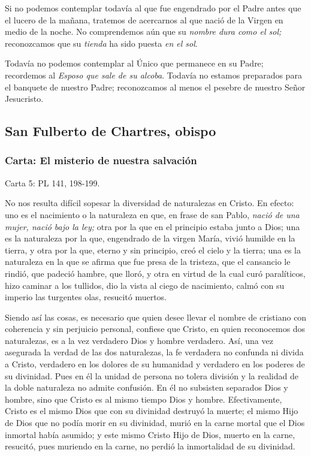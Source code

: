 Si no podemos contemplar todavía al que fue engendrado por el Padre antes que el lucero de la mañana, tratemos de acercarnos al que nació de la Virgen en medio de la noche. No comprendemos aún que su \emph{nombre dura como el sol;} reconozcamos que su \emph{tienda} ha sido puesta \emph{en el sol}.

Todavía no podemos contemplar al Único que permanece en su Padre; recordemos al \emph{Esposo que sale de su alcoba}. Todavía no estamos preparados para el banquete de nuestro Padre; reconozcamos al menos el pesebre de nuestro Señor Jesucristo.

\subsection{San Fulberto de Chartres, obispo}

\subsubsection{Carta: El misterio de nuestra salvación}

Carta 5: PL 141, 198-199.

No nos resulta difícil sopesar la diversidad de naturalezas en Cristo. En efecto: uno es el nacimiento o la naturaleza en que, en frase de san Pablo, \emph{nació de una mujer, nació bajo la ley;} otra por la que en el principio estaba junto a Dios; una es la naturaleza por la que, engendrado de la virgen María, vivió humilde en la tierra, y otra por la que, eterno y sin principio, creó el cielo y la tierra; una es la naturaleza en la que se afirma que fue presa de la tristeza, que el cansancio le rindió, que padeció hambre, que lloró, y otra en virtud de la cual curó paralíticos, hizo caminar a los tullidos, dio la vista al ciego de nacimiento, calmó con su imperio las turgentes olas, resucitó muertos.

Siendo así las cosas, es necesario que quien desee llevar el nombre de cristiano con coherencia y sin perjuicio personal, confiese que Cristo, en quien reconocemos dos naturalezas, es a la vez verdadero Dios y hombre verdadero. Así, una vez asegurada la verdad de las dos naturalezas, la fe verdadera no confunda ni divida a Cristo, verdadero en los dolores de su humanidad y verdadero en los poderes de su divinidad. Pues en él la unidad de persona no tolera división y la realidad de la doble naturaleza no admite confusión. En él no subsisten separados Dios y hombre, sino que Cristo es al mismo tiempo Dios y hombre. Efectivamente, Cristo es el mismo Dios que con su divinidad destruyó la muerte; el mismo Hijo de Dios que no podía morir en su divinidad, murió en la carne mortal que el Dios inmortal había asumido; y este mismo Cristo Hijo de Dios, muerto en la carne, resucitó, pues muriendo en la carne, no perdió la inmortalidad de su divinidad.

